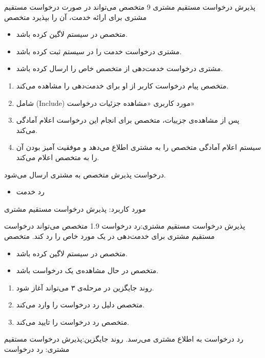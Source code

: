 {
	\usecase
	{پذیرش درخواست مستقیم مشتری}
	{9}
	{متخصص می‌تواند در صورت درخواست مستقیم مشتری برای ارائه خدمت، آن را بپذیرد}
	{متخصص}
	{}
	{	
		\begin{itemize}
			\vspace*{-0.6cm}
			\item 
			متخصص در سیستم لاگین کرده باشد.
			\item
			مشتری درخواست خدمت را در سیستم ثبت کرده باشد.
			\item
			مشتری درخواست خدمت‌دهی از متخصص خاص را ارسال کرده باشد.
		\end{itemize}
	}
	{
		\vspace*{-0.6cm}
		\begin{enumerate}
			\item
			متخصص پیام درخواست کاربر از او برای خدمت‌دهی را مشاهده می‌کند.
			\item 
			شامل (Include) مورد کاربری «مشاهده جزئیات درخواست»
			\item
			پس از مشاهده‌ی جزییات، متخصص برای انجام این درخواست اعلام آمادگی می‌کند.
			\item
			سیستم اعلام آمادگی متخصص را به مشتری اطلاع می‌دهد و موفقیت آمیز بودن آن را به متخصص اعلام می‌کند.
		\end{enumerate}
	}
	{درخواست پذیرش متخصص به مشتری ارسال می‌شود.}
	{
		\begin{itemize}
			\vspace*{-0.6cm}
			\item
			رد خدمت
		\end{itemize}
	}
	{
		مورد کاربرد: پذیرش درخواست مستقیم مشتری
	}
	
	\alternativeflow
	{
		پذیرش درخواست مستقیم مشتری:رد درخواست
	}
	{1.9}
	{
		متخصص می‌تواند درخواست‌ مستقیم مشتری برای خدمت‌دهی در یک مورد خاص را رد کند.
	}
	{
		متخصص
	}
	{}
	{
		\begin{itemize}
			\vspace*{-0.6cm}
			\item 
			متخصص در سیستم لاگین کرده باشد.
			\item
			متخصص در حال مشاهده‌ی یک درخواست باشد.
		\end{itemize}
	}
	{
		\vspace*{-0.6cm}
		\begin{enumerate}
			\item 
			روند جایگزین در مرحله‌ی ۳ می‌تواند آغاز شود.
			\item
			متخصص دلیل رد درخواست را وارد می‌کند.
			\item
			متخصص رد درخواست را تایید می‌کند.
		
		\end{enumerate}
	}
	{
		رد درخواست به اطلاع مشتری می‌رسد.
	}
	{
		روند جایگزین:پذیرش درخواست مستقیم مشتری: رد درخواست
	}
}


